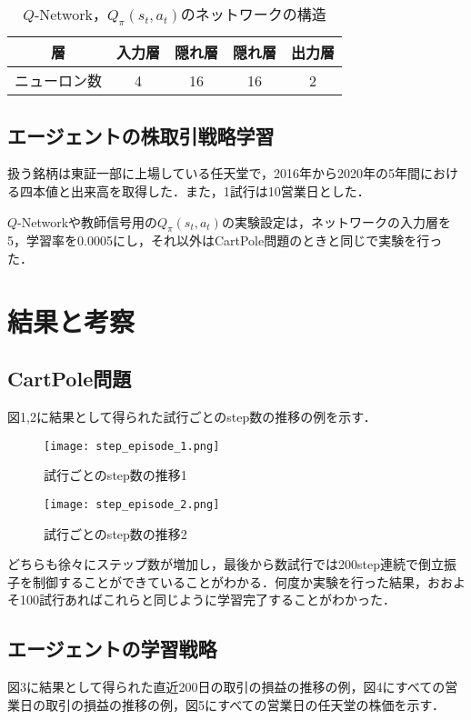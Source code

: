 \documentclass[twocolumn]{jarticle}
\begin{document}
        \begin{table}
            \caption{$Q$-Network，$Q_\pi(s_t,a_t)$のネットワークの構造}
            \begin{tabular}{|c|c|c|c|c|} \hline
                層 & 入力層 & 隠れ層 & 隠れ層 & 出力層 \\ \hline
                ニューロン数 & 4 & 16 & 16 & 2 \\ \hline
            \end{tabular}
        \end{table}
        
        \subsection{エージェントの株取引戦略学習}
        扱う銘柄は東証一部に上場している任天堂で，2016年から2020年の5年間における四本値と出来高を取得した．また，1試行は10営業日とした．
        
        $Q$-Networkや教師信号用の$Q_\pi(s_t,a_t)$の実験設定は，ネットワークの入力層を5，学習率を0.0005にし，それ以外はCartPole問題のときと同じで実験を行った．
    
\section{結果と考察}
        \subsection{CartPole問題}
        図1,2に結果として得られた試行ごとのstep数の推移の例を示す．

        \begin{figure}
            \texttt{[image: step\_episode\_1.png]}
            \caption{試行ごとのstep数の推移1}
        \end{figure}

        \begin{figure}
            \texttt{[image: step\_episode\_2.png]}
            \caption{試行ごとのstep数の推移2}
        \end{figure}

        どちらも徐々にステップ数が増加し，最後から数試行では200step連続で倒立振子を制御することができていることがわかる．何度か実験を行った結果，おおよそ100試行あればこれらと同じように学習完了することがわかった．

        \subsection{エージェントの学習戦略}
        図3に結果として得られた直近200日の取引の損益の推移の例，図4にすべての営業日の取引の損益の推移の例，図5にすべての営業日の任天堂の株価を示す．
\end{document}
